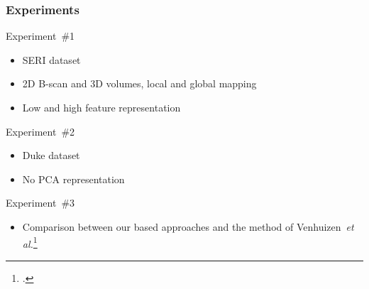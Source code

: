 \documentclass{beamer}
\begin{document}
\begin{frame}
\frametitle{Experiments}
\begin{block}{Experiment~\#1}
\begin{itemize}\footnotesize
\item SERI dataset 
\item 2D B-scan and 3D volumes, local and global mapping
\item Low and high feature representation 
\end{itemize}
\end{block}
\begin{block}{Experiment~\#2}
\begin{itemize}\footnotesize
\item Duke dataset
\item No PCA representation
\end{itemize}
\end{block}

\begin{block}{Experiment~\#3}
\begin{itemize}\footnotesize
\item Comparison between our based approaches and the method of Venhuizen~\emph{et al.}\footcite{Venhuizen2015}
\end{itemize}
\end{block}

\end{frame}
\end{document}
